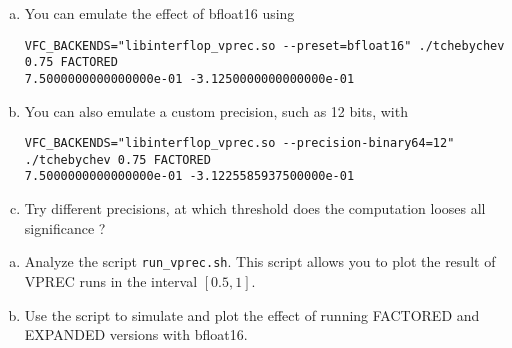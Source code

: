 \begin{question}
    \begin{enumerate}[(a)]
        \item You can emulate the effect of bfloat16 using
              \begin{verbatim}
VFC_BACKENDS="libinterflop_vprec.so --preset=bfloat16" ./tchebychev 0.75 FACTORED 
7.5000000000000000e-01 -3.1250000000000000e-01
\end{verbatim}
        \item You can also emulate a custom precision, such as 12 bits, with
              \begin{verbatim}
VFC_BACKENDS="libinterflop_vprec.so --precision-binary64=12" ./tchebychev 0.75 FACTORED 
7.5000000000000000e-01 -3.1225585937500000e-01
\end{verbatim}
        \item Try different precisions, at which threshold does the computation looses all significance ?
    \end{enumerate}
\end{question}

\begin{question}
    \begin{enumerate}[(a)]
        \item Analyze the script {\tt run\_vprec.sh}. This script allows you to plot the result of VPREC runs in the interval $[0.5,1]$.
        \item Use the script to simulate and plot the effect of running FACTORED and EXPANDED versions with bfloat16.
    \end{enumerate}
\end{question}
